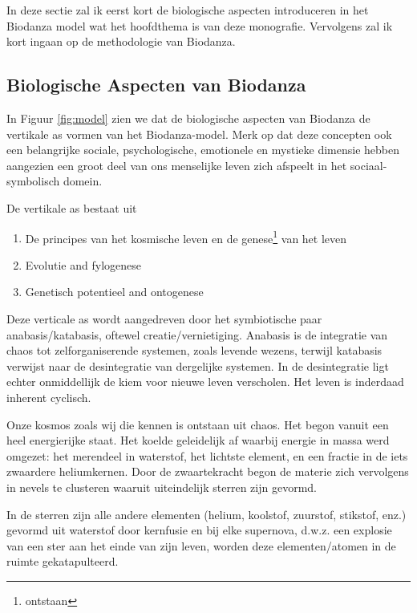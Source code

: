\documentclass[
  11pt,
]{book}
\providecommand{\tightlist}{%
  \setlength{\itemsep}{0pt}\setlength{\parskip}{0pt}}
\begin{document}
In deze sectie zal ik eerst kort de biologische aspecten introduceren in het Biodanza model wat het hoofdthema is van deze monografie. Vervolgens zal ik kort ingaan op de methodologie van Biodanza.

\hypertarget{biologische-aspecten-van-biodanza}{%
\subsection{Biologische Aspecten van Biodanza}\label{biologische-aspecten-van-biodanza}}

In Figuur \ref{fig:model} zien we dat de biologische aspecten van Biodanza de vertikale as vormen van het Biodanza-model. Merk op dat deze concepten ook een belangrijke sociale, psychologische, emotionele en mystieke dimensie hebben aangezien een groot deel van ons menselijke leven zich afspeelt in het sociaal-symbolisch domein.

De vertikale as bestaat uit

\begin{enumerate}
\def\labelenumi{\arabic{enumi}.}
\tightlist
\item
  De principes van het kosmische leven en de genese\footnote{ontstaan} van het leven
\item
  Evolutie and fylogenese
\item
  Genetisch potentieel and ontogenese
\end{enumerate}

Deze verticale as wordt aangedreven door het symbiotische paar anabasis/katabasis, oftewel creatie/vernietiging. Anabasis is de integratie van chaos tot zelforganiserende systemen, zoals levende wezens, terwijl katabasis verwijst naar de desintegratie van dergelijke systemen. In de desintegratie ligt echter onmiddellijk de kiem voor nieuwe leven verscholen. Het leven is inderdaad inherent cyclisch.

Onze kosmos zoals wij die kennen is ontstaan uit chaos. Het begon vanuit een heel energierijke staat. Het koelde geleidelijk af waarbij energie in massa werd omgezet: het merendeel in waterstof, het lichtste element, en een fractie in de iets zwaardere heliumkernen. Door de zwaartekracht begon de materie zich vervolgens in nevels te clusteren waaruit uiteindelijk sterren zijn gevormd.

In de sterren zijn alle andere elementen (helium, koolstof, zuurstof, stikstof, enz.) gevormd uit waterstof door kernfusie en bij elke supernova, d.w.z. een explosie van een ster aan het einde van zijn leven, worden deze elementen/atomen in de ruimte gekatapulteerd.
\end{document}
